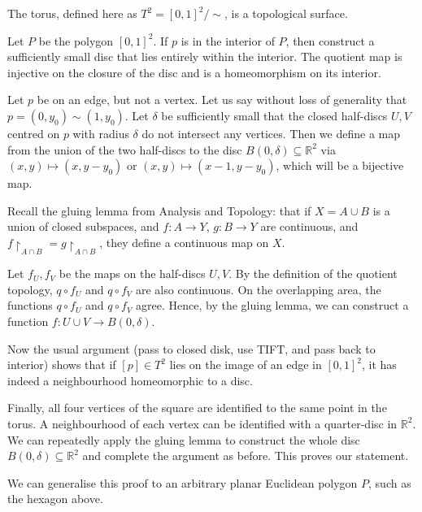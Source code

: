 \documentclass[a4paper,11pt]{article}
\begin{document}
\begin{example}
	The torus, defined here as \( T^2 = {[0,1]^2}/{\sim} \), is a topological surface.

	Let \( P \) be the polygon \( [0,1]^2 \).
	If \( p \) is in the interior of \( P \), then construct a sufficiently small disc that lies entirely within the interior.
	The quotient map is injective on the closure of the disc and is a homeomorphism on its interior.

	Let \( p \) be on an edge, but not a vertex.
	Let us say without loss of generality that \( p = (0,y_0) \sim (1,y_0) \).
	Let \( \delta \) be sufficiently small that the closed half-discs \( U, V \) centred on \( p \) with radius \( \delta \) do not intersect any vertices.
	Then we define a map from the union of the two half-discs to the disc \( B(0,\delta) \subseteq \mathbb R^2 \) via \( (x,y) \mapsto (x,y-y_0) \) or \( (x,y) \mapsto (x-1,y-y_0) \), which will be a bijective map.

	Recall the gluing lemma from Analysis and Topology: that if \( X = A \cup B \) is a union of closed subspaces, and \( f \colon A \to Y \), \( g \colon B \to Y \) are continuous, and \( f\restriction_{A \cap B} = g\restriction_{A \cap B} \), they define a continuous map on \( X \).

	Let \( f_U, f_V \) be the maps on the half-discs \( U, V \).
	By the definition of the quotient topology, \( q \circ f_U \) and \( q \circ f_V \) are also continuous.
	On the overlapping area, the functions \( q \circ f_U \) and \( q \circ f_V \) agree.
	Hence, by the gluing lemma, we can construct a function \( f \colon U \cup V \to B(0, \delta) \).

	Now the usual argument (pass to closed disk, use TIFT, and pass back to interior) shows that if \( [p] \in T^2 \) lies on the image of an edge in \( [0,1]^2 \), it has indeed a neighbourhood homeomorphic to a disc.

	Finally, all four vertices of the square are identified to the same point in the torus.
	A neighbourhood of each vertex can be identified with a quarter-disc in \( \mathbb R^2 \).
	We can repeatedly apply the gluing lemma to construct the whole disc \( B(0,\delta) \subseteq \mathbb R^2 \) and complete the argument as before. This proves our statement. 
\end{example}

We can generalise this proof to an arbitrary planar Euclidean polygon \( P \), such as the hexagon above.
\end{document}
